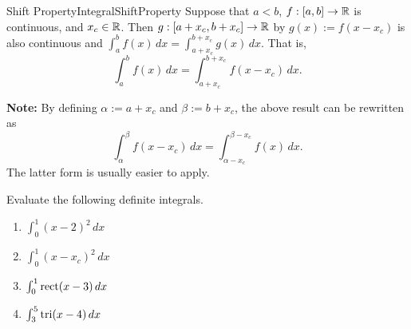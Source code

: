 \begin{propColor}{Shift Property}{IntegralShiftProperty}
Suppose that $a < b$, $f:[a, b] \to \mathbb R$ is continuous, and $x_c \in \mathbb R$. Then $g:[a + x_c, b+x_c] \to \mathbb R$ by $g(x):=f(x-x_c)$ is also continuous and
$\int_a^b f(x)\, dx = \int_{a+x_c}^{b+x_c} g(x)\, dx$. That is,
\begin{equation}
    \int_a^b f(x)\, dx = \int_{a+x_c}^{b+x_c} f(x-x_c)\, dx.
\end{equation}


\textbf{Note:} By defining $\alpha:=a + x_c$ and $\beta:=b+x_c$, the above result can be rewritten as 
\begin{equation}
 \boxed{   \int_\alpha^\beta f(x-x_c)\, dx = \int_{\alpha-x_c}^{\beta-x_c} f(x)\, dx.}
\end{equation}
The latter form is usually easier to apply.
\end{propColor}


\bigskip

\begin{example} Evaluate the following definite integrals.
\begin{enumerate}
\renewcommand{\labelenumi}{(\alph{enumi})}
\setlength{\itemsep}{.2cm}
    \item $\int_0^1 (x-2)^2 \, dx$

    \item $\int_0^1 (x-x_c)^2 \, dx$

     \item $\int_0^1 \mathrm{rect}(x-3)\, dx$

     \item $\int_3^5 \mathrm{tri}(x-4)\, dx$
\end{enumerate}
    
\end{example}

\solution 

